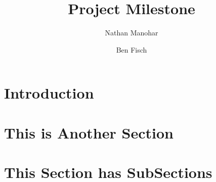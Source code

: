 \documentclass[letterpaper,twocolumn,10pt]{article}
\begin{document}
\date{}

\title{\Large \bf Project Milestone}

\author{
{\rm Nathan Manohar}\\
\and
{\rm Ben Fisch}\\
} %

\maketitle

\thispagestyle{empty}



\section{Introduction}


\section{This is Another Section}


\section{This Section has SubSections}





{\footnotesize 
}


\end{document}
